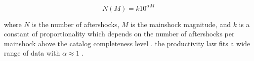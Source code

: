 \documentclass[draft, jgrga]{agujournal2018}
\begin{document}
\begin{linenomath*}
\begin{equation}\label{eq:productivity}
    N(M)=k10^{\alpha M}
\end{equation}
\end{linenomath*}
%
where $N$ is the number of aftershocks, $M$ is the mainshock magnitude, and $k$ is a constant of proportionality which depends on the number of aftershocks
per mainshock above the catalog completeness level \citep{Reasenberg1989}.  the productivity law fits a wide range of data with $\alpha\approx1$  \citep{Reasenberg1989, Yamanaka1990scalingshock,  DeArcangelis2016, Kisslinger1996,Tahir2015, Page}.  

\end{document}
